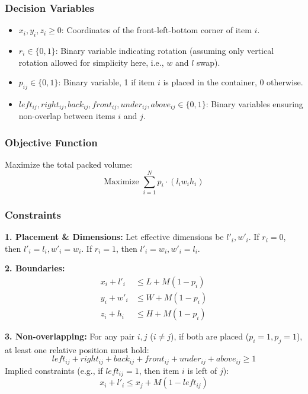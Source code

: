 \documentclass{article}
\begin{document}
\subsubsection{Decision Variables}
\begin{itemize}
    \item $x_i, y_i, z_i \ge 0$: Coordinates of the front-left-bottom corner of item $i$.
    \item $r_{i} \in \{0, 1\}$: Binary variable indicating rotation (assuming only vertical rotation allowed for simplicity here, i.e., $w$ and $l$ swap).
    \item $p_{ij} \in \{0, 1\}$: Binary variable, 1 if item $i$ is placed in the container, 0 otherwise.
    \item $left_{ij}, right_{ij}, back_{ij}, front_{ij}, under_{ij}, above_{ij} \in \{0, 1\}$: Binary variables ensuring non-overlap between items $i$ and $j$.
\end{itemize}

\subsubsection{Objective Function}
Maximize the total packed volume:
\begin{equation}
    \text{Maximize } \sum_{i=1}^{N} p_{i} \cdot (l_i w_i h_i)
\end{equation}

\subsubsection{Constraints}
\textbf{1. Placement & Dimensions:}
Let effective dimensions be $l'_i, w'_i$.
If $r_i=0$, then $l'_i=l_i, w'_i=w_i$. If $r_i=1$, then $l'_i=w_i, w'_i=l_i$.

\textbf{2. Boundaries:}
\begin{align}
    x_i + l'_i &\le L + M(1-p_i) \\
    y_i + w'_i &\le W + M(1-p_i) \\
    z_i + h_i &\le H + M(1-p_i)
\end{align}

\textbf{3. Non-overlapping:}
For any pair $i, j$ ($i \ne j$), if both are placed ($p_i=1, p_j=1$), at least one relative position must hold:
\begin{equation}
   left_{ij} + right_{ij} + back_{ij} + front_{ij} + under_{ij} + above_{ij} \ge 1
\end{equation}
Implied constraints (e.g., if $left_{ij}=1$, then item $i$ is left of $j$):
\begin{equation}
    x_i + l'_i \le x_j + M(1-left_{ij})
\end{equation}
\end{document}
